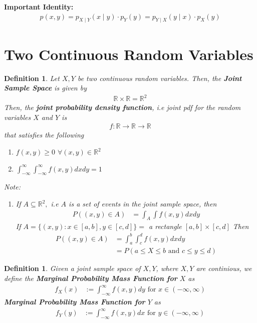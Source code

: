 \documentclass[11pt,oneside]{book}
\theoremstyle{newStyle}
\newtheorem{defn}[thm]{Definition}
\newcommand{\R}{\mathbb{R}}
\newcommand{\note}{\color{red}Note: \color{black}}
\begin{document}
\textbf{Important Identity:} \begin{align*}
p(x,y)=p_{X\mid Y}(x\mid y)\cdot p_Y(y)=p_{Y\mid X}(y\mid x)\cdot p_X(y)
\end{align*}
\section[Two Continuous Random Variables]{Two Continuous Random Variables}
\begin{defn}
Let $X,Y$ be two continuous random variables. Then, the \textbf{Joint Sample Space} is given by \begin{align*}
\R\times \R=\R^2
\end{align*}
Then, the \textbf{joint probability density function}, i.e joint pdf for the random variables $X$ and $Y$ is \begin{align*}
f:\R\to \R\to \R
\end{align*}
that satisfies the following \begin{enumerate}
\item $f(x,y)\geq 0$ $\forall(x,y)\in \R^2$
\item $\int_{-\infty}^{\infty}\int_{-\infty}^{\infty}f(x,y)dxdy=1$
\end{enumerate}
\note \begin{enumerate}
\item If $A\subseteq \R^2,$ i.e $A$ is a set of events in the joint sample space, then \begin{align*}
P((x,y)\in A)&=\int_{A} \int f(x,y)dxdy
\end{align*}
If $A=\{(x,y):x\in [a,b],y\in [c,d]\}=$ a rectangle $[a,b]\times [c,d]$ Then \begin{align*}
P((x,y)\in A)&=\int_{a}^{b} \int_{c}^{d} f(x,y)dxdy\\
&=P(a\leq X\leq b\text{ and }c\leq y\leq d)
\end{align*}
\end{enumerate}
\end{defn}
\begin{defn}
Given a joint sample space of $X,Y$, where $X,Y$ are continious, we define the \textbf{Marginal Probability Mass Function for }$X$ as \begin{align*}
f_X(x)&:=\int_{-\infty}^{\infty}f(x,y)dy \text{ for }x\in (-\infty,\infty)
\end{align*}
\textbf{Marginal Probability Mass Function for }$Y$ as \begin{align*}
f_Y(y)&:=\int_{-\infty}^{\infty}f(x,y)dx \text{ for }y\in (-\infty,\infty)
\end{align*}
\end{defn}
\end{document}
